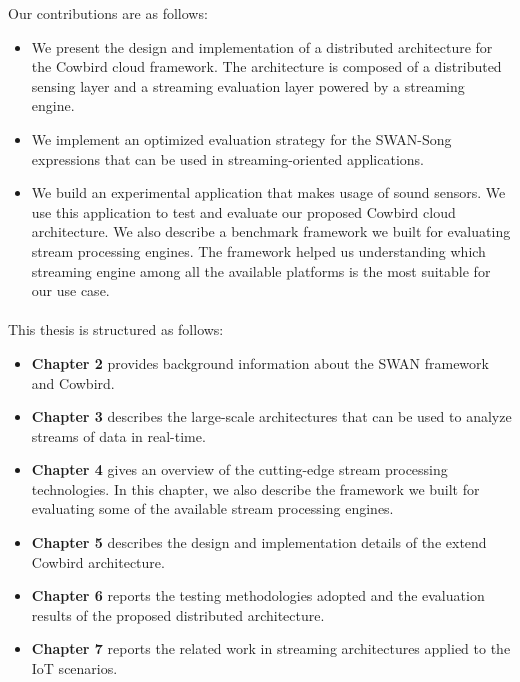 \newpage
Our contributions are as follows:
\begin{itemize}
\item We present the design and implementation of a distributed architecture for the Cowbird cloud framework. The architecture is composed of a distributed sensing layer and a streaming evaluation layer powered by a streaming engine. 

\item We implement an optimized evaluation strategy for the SWAN-Song expressions that can be used in streaming-oriented applications.

\item We build an experimental application that makes usage of sound sensors. We use this application to test and evaluate our proposed Cowbird cloud architecture. We also describe a benchmark framework we built for evaluating stream processing engines. The framework helped us understanding which streaming engine among all the available platforms is the most suitable for our use case.

\end{itemize}

\paragraph{}
This thesis is structured as follows: 
\begin{itemize}
\item \textbf{Chapter 2} provides background information about the SWAN framework and Cowbird.
\item	 \textbf{Chapter 3} describes the large-scale architectures that can be used to analyze streams of data in real-time.
\item \textbf{Chapter 4} gives an overview of the cutting-edge stream processing technologies. In this chapter, we also describe the framework we built for evaluating some of the available stream processing engines.
\item \textbf{Chapter 5} describes the design and implementation details of the extend Cowbird architecture.
\item \textbf{Chapter 6} reports the testing methodologies adopted and the evaluation results of the proposed distributed architecture.
\item \textbf{Chapter 7} reports the related work in streaming architectures applied to the IoT scenarios. 
\end{itemize}
